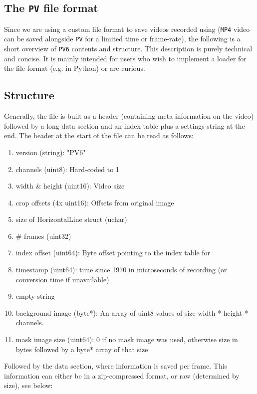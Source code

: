 \documentclass[9pt,lineno]{elife}
\newcommand{\TGrabs}{\protect\path{TGrabs}}
\begin{document}
\begin{appendixbox}
\section{The \texttt{PV} file format} \label{sec:pv_files}
Since we are using a custom file format to save videos recorded using \TGrabs{} (\texttt{MP4} video can be saved alongside \texttt{PV} for a limited time or frame-rate), the following is a short overview of \texttt{PV6} contents and structure. This description is purely technical and concise. It is mainly intended for users who wish to implement a loader for the file format (e.g. in Python) or are curious.

\subsection{Structure}

Generally, the file is built as a header (containing meta information on the video) followed by a long data section and an index table plus a settings string at the end. The header at the start of the file can be read as follows:

\begin{enumerate}
    \item version (string): "PV6"
    \item channels (uint8): Hard-coded to 1
    \item width \& height (uint16): Video size
    \item crop offsets (4x uint16): Offsets from original image
    \item size of HorizontalLine struct (uchar)
    \item \# frames (uint32)
    \item index offset (uint64): Byte offset pointing to the index table for
    \item timestamp (uint64): time since 1970 in microseconds of recording (or conversion time if unavailable)
    \item empty string
    \item background image (byte*): An array of uint8 values of size width * height * channels.
    \item mask image size (uint64): 0 if no mask image was used, otherwise size in bytes followed by a byte* array of that size
\end{enumerate}

Followed by the data section, where information is saved per frame. This information can either be in a zip-compressed format, or raw (determined by size), see below:


\end{appendixbox}
\end{document}
